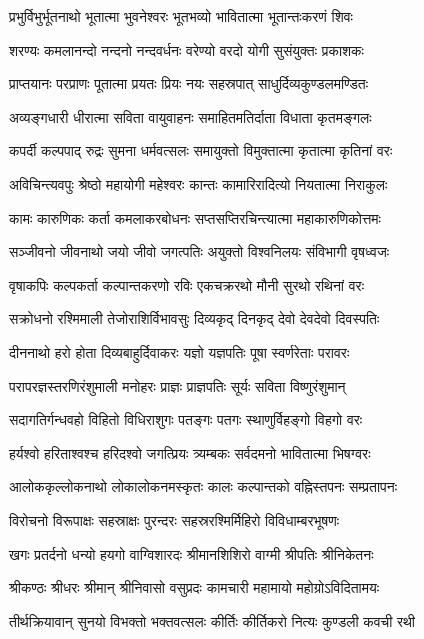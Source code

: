 \twolineshloka
{प्रभुर्विभुर्भूतनाथो भूतात्मा भुवनेश्वरः}
{भूतभव्यो भावितात्मा भूतान्तःकरणं शिवः}%

\twolineshloka
{शरण्यः कमलानन्दो नन्दनो नन्दवर्धनः}
{वरेण्यो वरदो योगी सुसंयुक्तः प्रकाशकः}%

\twolineshloka
{प्राप्तयानः परप्राणः पूतात्मा प्रयतः प्रियः}
{नयः सहस्रपात् साधुर्दिव्यकुण्डलमण्डितः}%

\twolineshloka
{अव्यङ्गधारी धीरात्मा सविता वायुवाहनः}
{समाहितमतिर्दाता विधाता कृतमङ्गलः}%

\twolineshloka
{कपर्दी कल्पपाद् रुद्रः सुमना धर्मवत्सलः}
{समायुक्तो विमुक्तात्मा कृतात्मा कृतिनां वरः}%

\twolineshloka
{अविचिन्त्यवपुः श्रेष्ठो महायोगी महेश्वरः}
{कान्तः कामारिरादित्यो नियतात्मा निराकुलः}%

\twolineshloka
{कामः कारुणिकः कर्ता कमलाकरबोधनः}
{सप्तसप्तिरचिन्त्यात्मा महाकारुणिकोत्तमः}%

\twolineshloka
{सञ्जीवनो जीवनाथो जयो जीवो जगत्पतिः}
{अयुक्तो विश्वनिलयः संविभागी वृषध्वजः}%

\twolineshloka
{वृषाकपिः कल्पकर्ता कल्पान्तकरणो रविः}
{एकचक्ररथो मौनी सुरथो रथिनां वरः}%

\twolineshloka
{सक्रोधनो रश्मिमाली तेजोराशिर्विभावसुः}
{दिव्यकृद् दिनकृद् देवो देवदेवो दिवस्पतिः}%

\twolineshloka
{दीननाथो हरो  होता दिव्यबाहुर्दिवाकरः}
{यज्ञो यज्ञपतिः पूषा स्वर्णरेताः परावरः}%

\twolineshloka
{परापरज्ञस्तरणिरंशुमाली मनोहरः}
{प्राज्ञः प्राज्ञपतिः सूर्यः सविता विष्णुरंशुमान्}%

\twolineshloka
{सदागतिर्गन्धवहो विहितो विधिराशुगः}
{पतङ्गः पतगः स्थाणुर्विहङ्गो विहगो वरः}%

\twolineshloka
{हर्यश्वो हरिताश्वश्च हरिदश्वो जगत्प्रियः}
{त्र्यम्बकः सर्वदमनो भावितात्मा भिषग्वरः}%

\twolineshloka
{आलोककृल्लोकनाथो लोकालोकनमस्कृतः}
{कालः कल्पान्तको वह्निस्तपनः सम्प्रतापनः}%

\twolineshloka
{विरोचनो विरूपाक्षः सहस्राक्षः पुरन्दरः}
{सहस्ररश्मिर्मिहिरो विविधाम्बरभूषणः}%

\twolineshloka
{खगः प्रतर्दनो धन्यो हयगो वाग्विशारदः}
{श्रीमानशिशिरो वाग्मी श्रीपतिः श्रीनिकेतनः}%

\twolineshloka
{श्रीकण्ठः श्रीधरः श्रीमान्  श्रीनिवासो वसुप्रदः}
{कामचारी महामायो महोग्रोऽविदितामयः}%

\twolineshloka
{तीर्थक्रियावान् सुनयो विभक्तो भक्तवत्सलः}
{कीर्तिः कीर्तिकरो नित्यः कुण्डली कवची रथी}%

